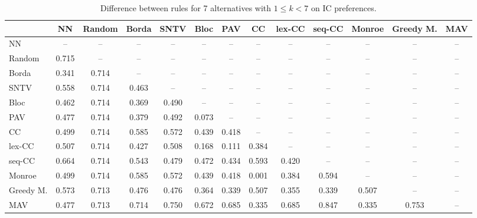 
\begin{table*}[h!]
\centering
\begin{tabular}{lcccccccccccc}
\toprule
 & NN & Random & Borda & SNTV & Bloc & PAV & CC & lex-CC & seq-CC & Monroe & Greedy M. & MAV \\
\midrule
NN & -- & -- & -- & -- & -- & -- & -- & -- & -- & -- & -- & -- \\
Random & 0.715 & -- & -- & -- & -- & -- & -- & -- & -- & -- & -- & -- \\
Borda & 0.341 & 0.714 & -- & -- & -- & -- & -- & -- & -- & -- & -- & -- \\
SNTV & 0.558 & 0.714 & 0.463 & -- & -- & -- & -- & -- & -- & -- & -- & -- \\
Bloc & 0.462 & 0.714 & 0.369 & 0.490 & -- & -- & -- & -- & -- & -- & -- & -- \\
PAV & 0.477 & 0.714 & 0.379 & 0.492 & 0.073 & -- & -- & -- & -- & -- & -- & -- \\
CC & 0.499 & 0.714 & 0.585 & 0.572 & 0.439 & 0.418 & -- & -- & -- & -- & -- & -- \\
lex-CC & 0.507 & 0.714 & 0.427 & 0.508 & 0.168 & 0.111 & 0.384 & -- & -- & -- & -- & -- \\
seq-CC & 0.664 & 0.714 & 0.543 & 0.479 & 0.472 & 0.434 & 0.593 & 0.420 & -- & -- & -- & -- \\
Monroe & 0.499 & 0.714 & 0.585 & 0.572 & 0.439 & 0.418 & 0.001 & 0.384 & 0.594 & -- & -- & -- \\
Greedy M. & 0.573 & 0.713 & 0.476 & 0.476 & 0.364 & 0.339 & 0.507 & 0.355 & 0.339 & 0.507 & -- & -- \\
MAV & 0.477 & 0.713 & 0.714 & 0.750 & 0.672 & 0.685 & 0.335 & 0.685 & 0.847 & 0.335 & 0.753 & -- \\
\bottomrule
\end{tabular}

\caption{Difference between rules for 7 alternatives with $1 \leq k < 7$ on IC preferences.}
\end{table*}
